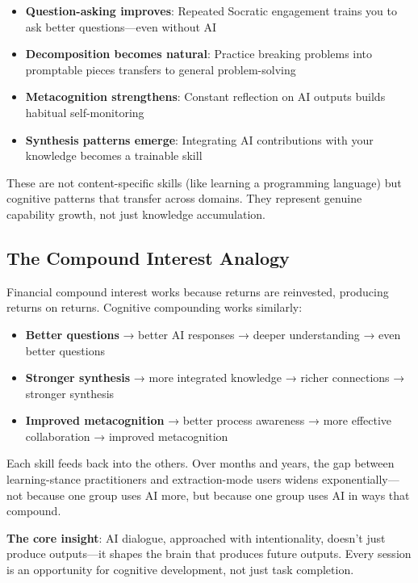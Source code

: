 \begin{itemize}
    \item \textbf{Question-asking improves}: Repeated Socratic engagement trains you to ask better questions---even without AI

    \item \textbf{Decomposition becomes natural}: Practice breaking problems into promptable pieces transfers to general problem-solving

    \item \textbf{Metacognition strengthens}: Constant reflection on AI outputs builds habitual self-monitoring

    \item \textbf{Synthesis patterns emerge}: Integrating AI contributions with your knowledge becomes a trainable skill
\end{itemize}

These are not content-specific skills (like learning a programming language) but cognitive patterns that transfer across domains. They represent genuine capability growth, not just knowledge accumulation.

\subsection{The Compound Interest Analogy}

Financial compound interest works because returns are reinvested, producing returns on returns. Cognitive compounding works similarly:

\begin{itemize}
    \item \textbf{Better questions} → better AI responses → deeper understanding → even better questions
    \item \textbf{Stronger synthesis} → more integrated knowledge → richer connections → stronger synthesis
    \item \textbf{Improved metacognition} → better process awareness → more effective collaboration → improved metacognition
\end{itemize}

Each skill feeds back into the others. Over months and years, the gap between learning-stance practitioners and extraction-mode users widens exponentially---not because one group uses AI more, but because one group uses AI in ways that compound.

\begin{quotebox}
\textbf{The core insight}: AI dialogue, approached with intentionality, doesn't just produce outputs---it shapes the brain that produces future outputs. Every session is an opportunity for cognitive development, not just task completion.
\end{quotebox}
